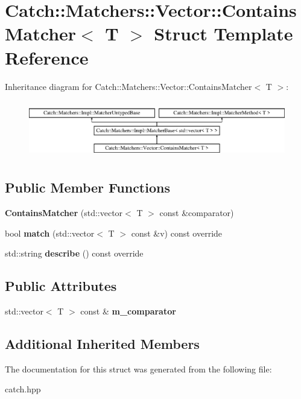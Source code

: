 \hypertarget{structCatch_1_1Matchers_1_1Vector_1_1ContainsMatcher}{}\section{Catch\+::Matchers\+::Vector\+::Contains\+Matcher$<$ T $>$ Struct Template Reference}
\label{structCatch_1_1Matchers_1_1Vector_1_1ContainsMatcher}
Inheritance diagram for Catch\+::Matchers\+::Vector\+::Contains\+Matcher$<$ T $>$\+:\begin{figure}[H]
\begin{center}
\leavevmode
\includegraphics[height=2.514970cm]{structCatch_1_1Matchers_1_1Vector_1_1ContainsMatcher}
\end{center}
\end{figure}
\subsection*{Public Member Functions}
\begin{DoxyCompactItemize}
\item 
\mbox{\label{structCatch_1_1Matchers_1_1Vector_1_1ContainsMatcher_ad8e92c8399be6dce75bb5702cdfab700}} 
{\bfseries Contains\+Matcher} (std\+::vector$<$ T $>$ const \&comparator)
\item 
\mbox{\label{structCatch_1_1Matchers_1_1Vector_1_1ContainsMatcher_afd33467ae48a41a634572b41b053f67f}} 
bool {\bfseries match} (std\+::vector$<$ T $>$ const \&v) const override
\item 
\mbox{\label{structCatch_1_1Matchers_1_1Vector_1_1ContainsMatcher_abe6a9ea3d6506c9a1f75ff524f35832e}} 
std\+::string {\bfseries describe} () const override
\end{DoxyCompactItemize}
\subsection*{Public Attributes}
\begin{DoxyCompactItemize}
\item 
\mbox{\label{structCatch_1_1Matchers_1_1Vector_1_1ContainsMatcher_a83d051166e4ed0d535219ad6ee99abb2}} 
std\+::vector$<$ T $>$ const  \& {\bfseries m\+\_\+comparator}
\end{DoxyCompactItemize}
\subsection*{Additional Inherited Members}


The documentation for this struct was generated from the following file\+:\begin{DoxyCompactItemize}
\item 
catch.\+hpp\end{DoxyCompactItemize}
